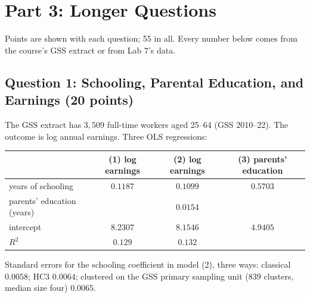 \documentclass[11pt]{article}
\begin{document}
\newpage
\section*{Part 3: Longer Questions}
Points are shown with each question; 55 in all. Every number below comes from the course's GSS extract or from Lab 7's
data.

\subsection*{Question 1: Schooling, Parental Education, and Earnings (20 points)}
The GSS extract has $3{,}509$ full-time workers aged 25--64 (GSS 2010--22). The outcome is
log annual earnings. Three OLS regressions:
\begin{center}\small
\renewcommand{\arraystretch}{1.15}
\begin{tabular}{lccc}
\toprule
 & (1) log earnings & (2) log earnings & (3) parents' education \\
\midrule
years of schooling & $0.1187$ & $0.1099$ & $0.5703$ \\
parents' education (years) & & $0.0154$ & \\
intercept & $8.2307$ & $8.1546$ & $4.9405$ \\
$R^2$ & $0.129$ & $0.132$ & \\
\bottomrule
\end{tabular}
\end{center}
Standard errors for the schooling coefficient in model (2), three ways:
classical $0.0058$; HC3 $0.0064$; clustered on the GSS primary sampling unit ($839$ clusters,
median size four) $0.0065$.
\end{document}
